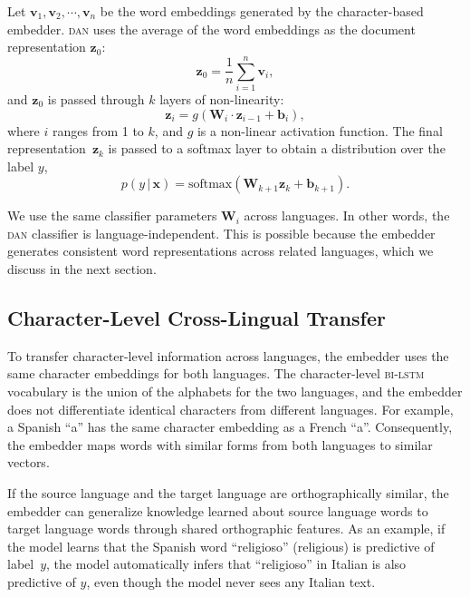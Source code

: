 \documentclass[letterpaper]{article} %
\newcommand{\g}{\, | \,}
\newcommand{\abr}[1]{\textsc{#1}}
\newcommand{\vect}[1]{\bm{\mathbf{#1}}}
\begin{document}
Let  $\vect{v}_1,\vect{v}_2,\cdots,\vect{v}_n$ be the word embeddings
generated by the character-based embedder.
\abr{dan} uses the average of the word embeddings as the document
representation $\vect{z}_0$:
\begin{equation}
\vect{z}_0 = \frac{1}{n}\sum_{i=1}^n \vect{v}_i,
\end{equation}
and $\vect{z}_0$ is passed through $k$ layers of non-linearity:
\begin{equation}
\vect{z}_i = g(\vect{W}_i \cdot \vect{z}_{i-1} + \vect{b}_i),
\end{equation}
where $i$ ranges from 1 to $k$, and $g$ is a non-linear activation
function.
The final representation~$\vect{z}_{k}$ is passed to a softmax layer to obtain
a distribution over the label $y$,
\begin{equation}
p(y \g \vect{x}) = \text{softmax}(\vect{W}_{k+1} \vect{z}_k + \vect{b}_{k+1}).
\end{equation}

We use the same classifier parameters $\vect{W}_i$ across languages.
In other words, the \abr{dan} classifier is language-independent.
This is possible because the embedder generates consistent word representations
across related languages, which we discuss in the next section.

\subsection{Character-Level Cross-Lingual Transfer}
\label{ssec:char}

To transfer character-level information across languages, the embedder uses
the same character embeddings for both languages.
The character-level \abr{bi-lstm} vocabulary is the union of the alphabets for
the two languages, and the embedder does not differentiate identical characters
from different languages.
For example, a Spanish ``a'' has the same character embedding as a French
``a''.
Consequently, the embedder maps words with similar forms from both languages to
similar vectors.

If the source language and the target language are orthographically similar, the
embedder can generalize knowledge learned about source language words to target
language words through shared orthographic features.  As an example, if the
model learns that the Spanish word ``religioso'' (religious) is predictive of
label~$y$, the model automatically infers that ``religioso'' in Italian is also
predictive of $y$, even though the model never sees any Italian text.
\end{document}
